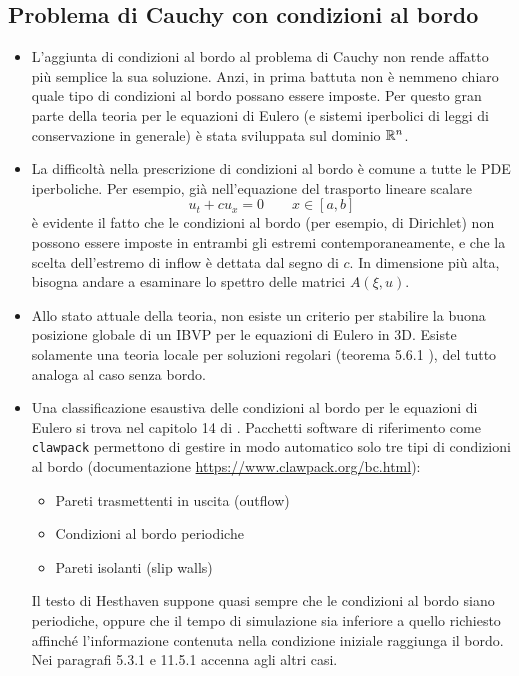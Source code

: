 \subsection*{Problema di Cauchy con condizioni al bordo}

\begin{itemize}
\item L'aggiunta di condizioni al bordo al problema di Cauchy
	non rende affatto più semplice la sua soluzione.
	Anzi, in prima battuta non è nemmeno chiaro quale tipo di condizioni al bordo
	possano essere imposte. Per questo gran parte della teoria
	per le equazioni di Eulero (e sistemi iperbolici
	di leggi di conservazione in generale) è stata sviluppata sul dominio $\mathbb{R}^n$.

\item La difficoltà nella prescrizione di condizioni al bordo
	è comune a tutte le PDE iperboliche. Per esempio,
	già nell'equazione del trasporto lineare scalare
	\[
	u_t + cu_x = 0
	\qquad x \in [a,b]
	\]
	è evidente il fatto che le condizioni al bordo (per esempio, di Dirichlet)
	non possono essere imposte in entrambi gli estremi contemporaneamente,
	e che la scelta dell'estremo di inflow è dettata dal segno di $c$.
	In dimensione più alta, bisogna andare a esaminare lo spettro
	delle matrici $A(\xi,u)$.

\item Allo stato attuale della teoria, non esiste un criterio
	per stabilire la buona posizione globale di un IBVP
	per le equazioni di Eulero in 3D.
	Esiste solamente una teoria locale per soluzioni regolari (teorema 5.6.1
	\cite{dafermos}), del tutto analoga al caso senza bordo.

\item Una classificazione esaustiva delle condizioni al bordo
	per le equazioni di Eulero si trova nel capitolo 14 di \cite{benzoni-gavage-serre}.
	Pacchetti software di riferimento come \texttt{clawpack} permettono
	di gestire in modo automatico solo tre tipi di condizioni al bordo
	(documentazione \url{https://www.clawpack.org/bc.html}):
	\begin{itemize}
	\item Pareti trasmettenti in uscita (outflow)
	\item Condizioni al bordo periodiche
	\item Pareti isolanti (slip walls)
	\end{itemize}
	Il testo di Hesthaven suppone quasi sempre che le condizioni al bordo siano
	periodiche, oppure che il tempo di simulazione sia inferiore a quello richiesto
	affinché l'informazione contenuta nella condizione iniziale raggiunga il bordo.
	Nei paragrafi 5.3.1 e 11.5.1 accenna agli altri casi.
\end{itemize}

